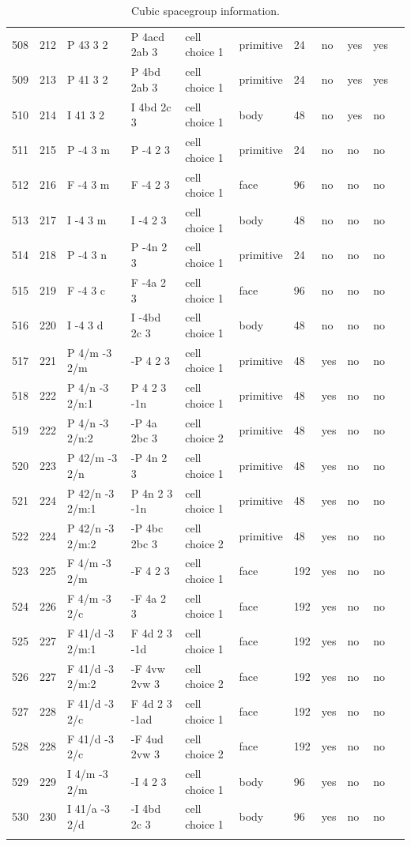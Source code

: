 \begin{center}
\begin{small}
\begin{longtable}{|l|l|l|l|l|l|l|l|l|l|l|}
508 &212 &P 43 3 2 &P 4acd 2ab 3 &cell choice 1 &primitive &24 &no &yes &yes \\ 
509 &213 &P 41 3 2 &P 4bd 2ab 3 &cell choice 1 &primitive &24 &no &yes &yes \\ 
510 &214 &I 41 3 2 &I 4bd 2c 3 &cell choice 1 &body &48 &no &yes &no \\ 
511 &215 &P -4 3 m &P -4 2 3 &cell choice 1 &primitive &24 &no &no &no \\ 
512 &216 &F -4 3 m &F -4 2 3 &cell choice 1 &face &96 &no &no &no \\ 
513 &217 &I -4 3 m &I -4 2 3 &cell choice 1 &body &48 &no &no &no \\ 
514 &218 &P -4 3 n &P -4n 2 3 &cell choice 1 &primitive &24 &no &no &no \\ 
515 &219 &F -4 3 c &F -4a 2 3 &cell choice 1 &face &96 &no &no &no \\ 
516 &220 &I -4 3 d &I -4bd 2c 3 &cell choice 1 &body &48 &no &no &no \\ 
517 &221 &P 4/m -3 2/m &-P 4 2 3 &cell choice 1 &primitive &48 &yes &no &no \\ 
518 &222 &P 4/n -3 2/n:1 &P 4 2 3 -1n &cell choice 1 &primitive &48 &yes &no &no \\ 
519 &222 &P 4/n -3 2/n:2 &-P 4a 2bc 3 &cell choice 2 &primitive &48 &yes &no &no \\ 
520 &223 &P 42/m -3 2/n &-P 4n 2 3 &cell choice 1 &primitive &48 &yes &no &no \\ 
521 &224 &P 42/n -3 2/m:1 &P 4n 2 3 -1n &cell choice 1 &primitive &48 &yes &no &no \\ 
522 &224 &P 42/n -3 2/m:2 &-P 4bc 2bc 3 &cell choice 2 &primitive &48 &yes &no &no \\ 
523 &225 &F 4/m -3 2/m &-F 4 2 3 &cell choice 1 &face &192 &yes &no &no \\ 
524 &226 &F 4/m -3 2/c &-F 4a 2 3 &cell choice 1 &face &192 &yes &no &no \\ 
525 &227 &F 41/d -3 2/m:1 &F 4d 2 3 -1d &cell choice 1 &face &192 &yes &no &no \\ 
526 &227 &F 41/d -3 2/m:2 &-F 4vw 2vw 3 &cell choice 2 &face &192 &yes &no &no \\ 
527 &228 &F 41/d -3 2/c &F 4d 2 3 -1ad &cell choice 1 &face &192 &yes &no &no \\ 
528 &228 &F 41/d -3 2/c &-F 4ud 2vw 3 &cell choice 2 &face &192 &yes &no &no \\ 
529 &229 &I 4/m -3 2/m &-I 4 2 3 &cell choice 1 &body &96 &yes &no &no \\ 
530 &230 &I 41/a -3 2/d &-I 4bd 2c 3 &cell choice 1 &body &96 &yes &no &no \\ 
\hline
\caption{Cubic spacegroup information.}
\end{longtable}
\end{small}
\end{center}

